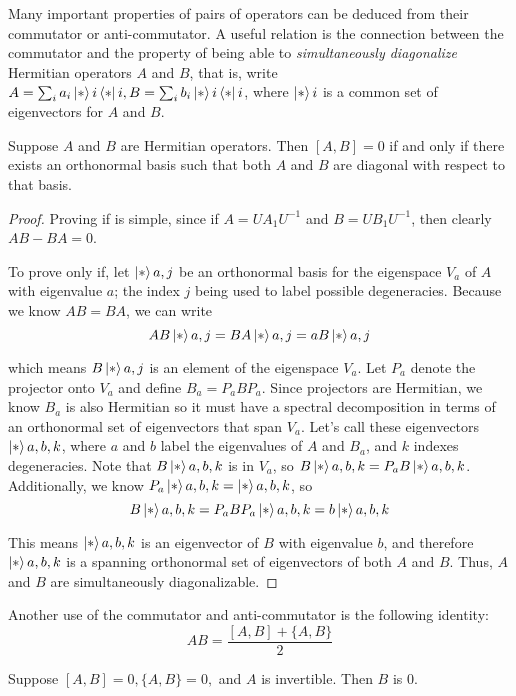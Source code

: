 Many important properties of pairs of operators can be deduced from their commutator or anti-commutator. A useful relation is the connection between the commutator and the property of being able to \textit{simultaneously diagonalize} Hermitian operators $A$ and $B$, that is, write $A = \sum_{i} a_{i} \ket*{i} \bra*{i}, B = \sum_{i} b_{i} \ket*{i} \bra*{i}$, where $\ket*{i}$ is a common set of eigenvectors for $A$ and $B$. 

\begin{theorem}
Suppose $A$ and $B$ are Hermitian operators. Then $[A, B] = 0$ if and only if there exists an orthonormal basis such that both $A$ and $B$ are diagonal with respect to that basis. 
\end{theorem}

\begin{proof}
Proving if is simple, since if $A= UA_{1}U^{-1}$ and $B = UB_{1}U^{-1}$, then clearly $AB - BA = 0$. 

To prove only if, let $\ket*{a, j}$ be an orthonormal basis for the eigenspace $V_{a}$ of $A$ with eigenvalue $a$; the index $j$ being used to label possible degeneracies. Because we know $AB = BA$, we can write
$$AB \ket*{a, j} = BA \ket*{a, j} = aB \ket*{a, j}$$

which means $B\ket*{a, j}$ is an element of the eigenspace $V_{a}$. Let $P_{a}$ denote the projector onto $V_{a}$ and define $B_{a} = P_{a} BP_{a}$. Since projectors are Hermitian, we know $B_{a}$ is also Hermitian so it must have a spectral decomposition in terms of an orthonormal set of eigenvectors that span $V_{a}$. Let's call these eigenvectors $\ket*{a, b, k}$, where $a$ and $b$ label the eigenvalues of $A$ and $B_{a}$, and $k$ indexes degeneracies. Note that $B \ket*{a, b, k}$ is in $V_{a}$, so $B \ket*{a, b, k} = P_{a} B \ket*{a, b, k}$. Additionally, we know $P_{a} \ket*{a, b, k} = \ket*{a, b, k}$, so 
$$B \ket*{a, b, k} = P_{a} B P_{a} \ket*{a, b, k} = b \ket*{a, b, k}$$

This means $\ket*{a, b, k}$ is an eigenvector of $B$ with eigenvalue $b$, and therefore $\ket*{a, b, k}$ is a spanning orthonormal set of eigenvectors of both $A$ and $B$. Thus, $A$ and $B$ are simultaneously diagonalizable. 
\end{proof}

Another use of the commutator and anti-commutator is the following identity: 
$$AB = \frac{[A, B] + \{A, B\}}{2}$$

\begin{lemma}
Suppose $[A, B] = 0, \{A, B\} = 0,$ and $A$ is invertible. Then $B$ is 0. 
\end{lemma}

